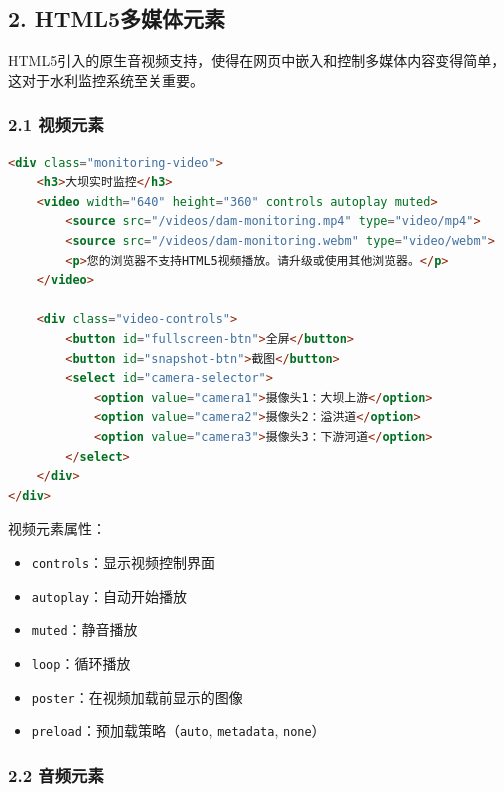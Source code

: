 \subsection{2.
HTML5多媒体元素}\label{html5ux591aux5a92ux4f53ux5143ux7d20}

HTML5引入的原生音视频支持，使得在网页中嵌入和控制多媒体内容变得简单，这对于水利监控系统至关重要。

\subsubsection{2.1 视频元素}\label{ux89c6ux9891ux5143ux7d20}

\begin{lstlisting}[language=HTML]
<div class="monitoring-video">
    <h3>大坝实时监控</h3>
    <video width="640" height="360" controls autoplay muted>
        <source src="/videos/dam-monitoring.mp4" type="video/mp4">
        <source src="/videos/dam-monitoring.webm" type="video/webm">
        <p>您的浏览器不支持HTML5视频播放。请升级或使用其他浏览器。</p>
    </video>
    
    <div class="video-controls">
        <button id="fullscreen-btn">全屏</button>
        <button id="snapshot-btn">截图</button>
        <select id="camera-selector">
            <option value="camera1">摄像头1：大坝上游</option>
            <option value="camera2">摄像头2：溢洪道</option>
            <option value="camera3">摄像头3：下游河道</option>
        </select>
    </div>
</div>
\end{lstlisting}

视频元素属性：

\begin{itemize}
\tightlist
\item
  \passthrough{\lstinline!controls!}：显示视频控制界面
\item
  \passthrough{\lstinline!autoplay!}：自动开始播放
\item
  \passthrough{\lstinline!muted!}：静音播放
\item
  \passthrough{\lstinline!loop!}：循环播放
\item
  \passthrough{\lstinline!poster!}：在视频加载前显示的图像
\item
  \passthrough{\lstinline!preload!}：预加载策略（\passthrough{\lstinline!auto!},
  \passthrough{\lstinline!metadata!}, \passthrough{\lstinline!none!}）
\end{itemize}

\subsubsection{2.2 音频元素}\label{ux97f3ux9891ux5143ux7d20}

